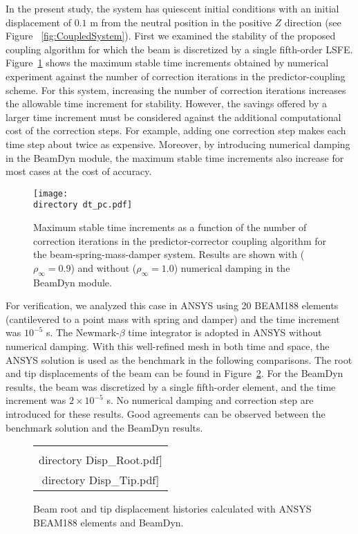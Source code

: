 \documentclass{aiaa-tc}
\def\directory{EPSF/}
\begin{document}
In the present study, the system has quiescent initial conditions with an initial displacement of $0.1$ m from the neutral position in the positive $Z$ direction (see Figure ~\ref{fig:CoupledSystem}). 
First we examined the stability of the proposed coupling algorithm for which the beam is discretized by a single fifth-order LSFE. 
Figure~\ref{fig:CoupledDTPC} shows the maximum stable time increments obtained by numerical experiment against the number of correction iterations in the predictor-coupling scheme.  
For this system, increasing the number of correction iterations increases the allowable time increment for stability.  However, the savings offered by a larger time increment must be considered against the additional computational cost of the correction steps.  For example, adding one correction step makes each time step about twice as expensive.
Moreover, by introducing numerical damping in the BeamDyn module, the maximum stable time increments also increase for most cases at the cost of accuracy.\cite{Bauchau:2010}

 \begin{figure}
\centering
\texttt{[image: \\directory dt\_pc.pdf]}
\caption{Maximum stable time increments as a function of the number of correction iterations in the predictor-corrector coupling algorithm for the beam-spring-mass-damper system. Results are shown with ($\rho_\infty = 0.9$) and without ($\rho_\infty = 1.0$) numerical damping in the BeamDyn module.
} 
\label{fig:CoupledDTPC}
\end{figure}
 
For verification, we analyzed this case in ANSYS using 20 BEAM188 elements (cantilevered to a point mass with spring and damper) and the time increment was $10^{-5}$ s. The Newmark-$\beta$ time integrator is adopted in ANSYS without numerical damping. 
With this well-refined mesh in both time and space, the ANSYS solution is used as the benchmark in the following comparisons. 
The root and tip displacements of the beam can be found in Figure~\ref{fig:E1Disp}. 
For the BeamDyn results, the beam was discretized by a single fifth-order element, and the time increment was  $2\times10^{-5}$ s. No numerical damping and correction step are introduced for these results.  
Good agreements can be observed between the benchmark solution and the BeamDyn results. 

\begin{figure}
    \centering
    \begin{tabular}{c}
    \subfloat[Root Displacement]{\label{fig:E1DispRoot}\texttt{[image: \\directory  Disp\_Root.pdf]}} \qquad
\subfloat[Tip Displacement]{\label{fig:E1DispTip}\texttt{[image: \\directory  Disp\_Tip.pdf]}}\\
\end{tabular}
\caption{Beam root and tip displacement histories calculated with ANSYS BEAM188 elements and BeamDyn.}
\label{fig:E1Disp}
\end{figure} 
\end{document}
